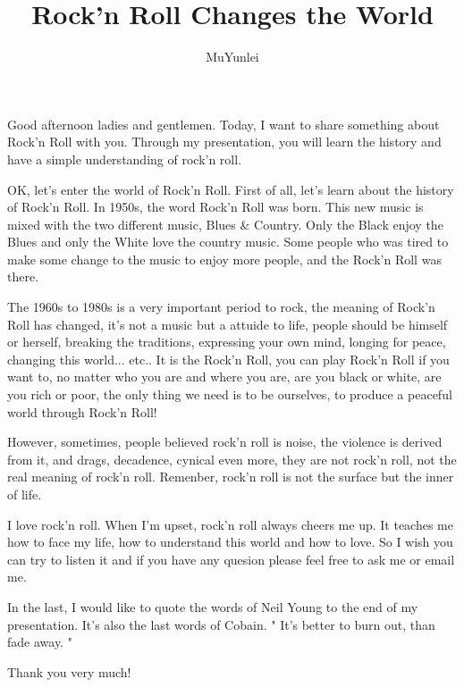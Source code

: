 \documentclass{article}
\title{Rock'n Roll Changes the World}
\author{MuYunlei}
\begin{document}
\maketitle
Good afternoon ladies and gentlemen. Today, I want to share something about Rock'n Roll with you. Through my presentation, you will learn the history and have a simple understanding of rock'n roll. 

OK, let's enter the world of Rock'n Roll. First of all, let's learn about the history of Rock'n Roll. In 1950s, the word Rock'n Roll was born. This new music is mixed with the two different music, Blues \& Country. Only the Black enjoy the Blues and only the White love the country music. Some people who was tired to make some change to the music to enjoy more people, and the Rock'n Roll was there. 

The 1960s to 1980s is a very important period to rock, the meaning of Rock'n Roll has changed, it's not a music but a attuide to life, people should be himself or herself, breaking the traditions, expressing your own mind, longing for peace, changing this world... etc.. It is the Rock'n Roll, you can play Rock'n Roll if you want to, no matter who you are and where you are, are you black or white, are you rich or poor, the only thing we need is to be ourselves, to produce a peaceful world through Rock'n Roll! 

However, sometimes, people believed rock'n roll is noise, the violence is derived from it, and drags, decadence, cynical even more, they are not rock'n roll, not the real meaning of rock'n roll. Remenber, rock'n roll is not the surface but the inner of life.

I love rock'n roll. When I'm upset, rock'n roll always cheers me up. It teaches me how to face my life, how to understand this world and how to love. So I wish you can try to listen it and if you have any quesion please feel free to ask me or email me.

In the last, I would like to quote the words of Neil Young to the end of my presentation. It's also the last words of Cobain. " It's better to burn out, than fade away. " 

Thank you very much!
\end{document}
